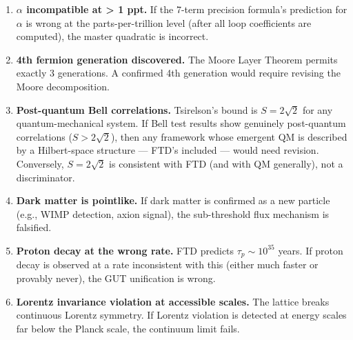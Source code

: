 \documentclass[
  11pt,
  letterpaper,
  twoside,
  openany]{book}
\begin{document}
\begin{tcolorbox}[enhanced jigsaw, colbacktitle=quarto-callout-important-color!10!white, titlerule=0mm, bottomtitle=1mm, bottomrule=.15mm, colback=white, arc=.35mm, breakable, toprule=.15mm, title=\textcolor{quarto-callout-important-color}{\faExclamation}\hspace{0.5em}{What would kill FTD}, rightrule=.15mm, coltitle=black, leftrule=.75mm, colframe=quarto-callout-important-color-frame, toptitle=1mm, opacityback=0, opacitybacktitle=0.6, left=2mm]

\begin{enumerate}
\def\labelenumi{\arabic{enumi}.}
\item
  \textbf{\(\alpha\) incompatible at \textgreater{} 1 ppt.} If the
  7-term precision formula's prediction for \(\alpha\) is wrong at the
  parts-per-trillion level (after all loop coefficients are computed),
  the master quadratic is incorrect.
\item
  \textbf{4th fermion generation discovered.} The Moore Layer Theorem
  permits exactly 3 generations. A confirmed 4th generation would
  require revising the Moore decomposition.
\item
  \textbf{Post-quantum Bell correlations.} Tsirelson's bound is
  \(S = 2\sqrt{2}\) for any quantum-mechanical system. If Bell test
  results show genuinely post-quantum correlations (\(S > 2\sqrt{2}\)),
  then any framework whose emergent QM is described by a Hilbert-space
  structure --- FTD's included --- would need revision. Conversely,
  \(S = 2\sqrt{2}\) is consistent with FTD (and with QM generally), not
  a discriminator.
\item
  \textbf{Dark matter is pointlike.} If dark matter is confirmed as a
  new particle (e.g., WIMP detection, axion signal), the sub-threshold
  flux mechanism is falsified.
\item
  \textbf{Proton decay at the wrong rate.} FTD predicts
  \(\tau_p \sim 10^{35}\) years. If proton decay is observed at a rate
  inconsistent with this (either much faster or provably never), the GUT
  unification is wrong.
\item
  \textbf{Lorentz invariance violation at accessible scales.} The
  lattice breaks continuous Lorentz symmetry. If Lorentz violation is
  detected at energy scales far below the Planck scale, the continuum
  limit fails.
\end{enumerate}

\end{tcolorbox}
\end{document}
